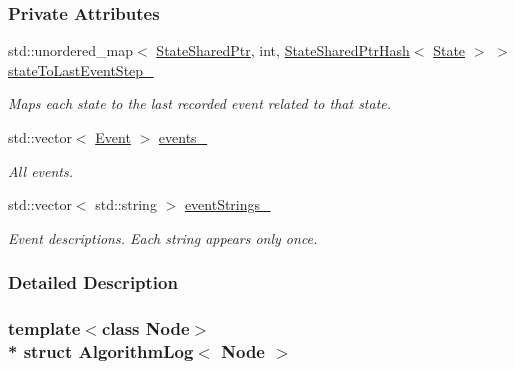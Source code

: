 \subsubsection*{Private Attributes}
\begin{DoxyCompactItemize}
\item 
std\+::unordered\+\_\+map$<$ \hyperlink{structAlgorithmLog_aa938278830c04450a447beb9ff249b3f}{State\+Shared\+Ptr}, int, \hyperlink{structStateSharedPtrHash}{State\+Shared\+Ptr\+Hash}$<$ \hyperlink{structAlgorithmLog_a64e28cd23a6e61e991d6826c7c0fe466}{State} $>$ $>$ \hyperlink{structAlgorithmLog_ac1215b5dfe4abc4161b4d5cf25191659}{state\+To\+Last\+Event\+Step\+\_\+}\hypertarget{structAlgorithmLog_ac1215b5dfe4abc4161b4d5cf25191659}{}\label{structAlgorithmLog_ac1215b5dfe4abc4161b4d5cf25191659}

\begin{DoxyCompactList}\small\item\em Maps each state to the last recorded event related to that state. \end{DoxyCompactList}\item 
std\+::vector$<$ \hyperlink{structAlgorithmLog_a7e0d48b82e3a6cbe4128c08f936fee9a}{Event} $>$ \hyperlink{structAlgorithmLog_a6eb1016587b4d32ab8c83d34c00dee2b}{events\+\_\+}\hypertarget{structAlgorithmLog_a6eb1016587b4d32ab8c83d34c00dee2b}{}\label{structAlgorithmLog_a6eb1016587b4d32ab8c83d34c00dee2b}

\begin{DoxyCompactList}\small\item\em All events. \end{DoxyCompactList}\item 
std\+::vector$<$ std\+::string $>$ \hyperlink{structAlgorithmLog_a6dbe608bb9158926acfd1b2445eb0d99}{event\+Strings\+\_\+}\hypertarget{structAlgorithmLog_a6dbe608bb9158926acfd1b2445eb0d99}{}\label{structAlgorithmLog_a6dbe608bb9158926acfd1b2445eb0d99}

\begin{DoxyCompactList}\small\item\em Event descriptions. Each string appears only once. \end{DoxyCompactList}\end{DoxyCompactItemize}


\subsubsection{Detailed Description}
\subsubsection*{template$<$class Node$>$\\*
struct Algorithm\+Log$<$ Node $>$}

